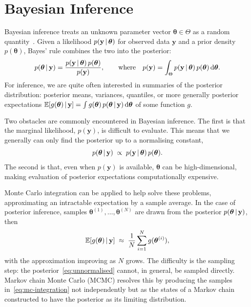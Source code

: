 \chapter{Bayesian Inference}
\label{ch:mcmc}

Bayesian inference treats an unknown parameter vector
$\bm{\theta} \in \Theta$ as a random quantity~\citep{gelman2013bda}.
Given a likelihood
$p(\mathbf{y} \,|\, \bm{\theta})$ for observed data $\mathbf{y}$ and
a prior density $p(\bm{\theta})$, Bayes' rule combines the two into
the posterior:
%
\begin{equation}
  p(\bm{\theta} \,|\, \mathbf{y})
  = \frac{p(\mathbf{y} \,|\, \bm{\theta})\,p(\bm{\theta})}
         {p(\mathbf{y})},
  \qquad \text{where} \quad
  p(\mathbf{y}) = \int_{\Theta}
  p(\mathbf{y} \,|\, \bm{\theta})\,p(\bm{\theta}) \,\mathrm{d}\bm{\theta}.
  \label{eq:bayes-rule}
\end{equation}
%
For inference, we are quite often interested in summaries of the posterior distribution: posterior means, variances, quantiles, or more generally posterior expectations
$\mathbb{E}[g(\bm{\theta}) \,|\, \mathbf{y}] = \int g(\bm{\theta})\,
p(\bm{\theta} \,|\, \mathbf{y}) \,\mathrm{d}\bm{\theta}$ of some function $g$.

Two obstacles are commonly encountered in Bayesian inference. The first is that the marginal likelihood, 
$p(\mathbf{y})$, is difficult to evaluate. This means that we generally can only find the posterior up to a normalising constant,
%
\begin{equation}
  p(\bm{\theta} \,|\, \mathbf{y}) \;\propto\;
  p(\mathbf{y} \,|\, \bm{\theta})\,p(\bm{\theta}).
  \label{eq:unnormalised}
\end{equation}
%
The second is that, even when $p(\mathbf{y})$ is available, $\bm{\theta}$ can be high-dimensional, making evaluation of posterior expectations computationally expensive.

Monte Carlo integration can be applied to help solve these problems, approximating an intractable expectation by a sample average. In the case of posterior inference, samples $\bm{\theta}^{(1)}, \dots, \bm{\theta}^{(N)}$ are
drawn from the posterior $p(\bm{\theta} \,|\, \mathbf{y})$, then
%
\begin{equation}
  \mathbb{E}[g(\bm{\theta}) \,|\, \mathbf{y}]
  \;\approx\; \frac{1}{N}\sum_{i=1}^{N} g(\bm{\theta}^{(i)}),
  \label{eq:mc-integration}
\end{equation}
%
with the approximation improving as $N$ grows. The difficulty is the
sampling step: the posterior~\eqref{eq:unnormalised} cannot, in general,
be sampled directly. Markov chain Monte Carlo (MCMC) resolves this by
producing the samples in~\eqref{eq:mc-integration} not independently
but as the states of a Markov chain constructed to have the posterior
as its limiting distribution.


